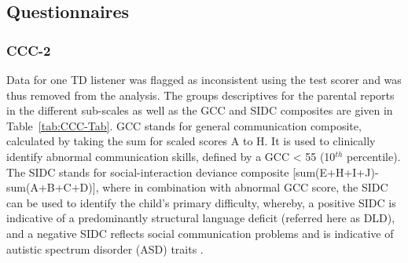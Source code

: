 \documentclass[a4paper, twoside]{templates/ociamthesis}
\begin{document}
\hypertarget{questionnaires-1}{%
\subsection{Questionnaires}\label{questionnaires-1}}

\hypertarget{ccc-2}{%
\subsubsection{CCC-2}\label{ccc-2}}

Data for one TD listener was flagged as inconsistent using the test scorer and was thus removed from the analysis. The groups descriptives for the parental reports in the different sub-scales as well as the GCC and SIDC composites are given in Table~\ref{tab:CCC-Tab}. GCC stands for general communication composite, calculated by taking the sum for scaled scores A to H. It is used to clinically identify abnormal communication skills, defined by a GCC \textless{} 55 (10\(^{th}\) percentile). The SIDC stands for social-interaction deviance composite {[}sum(E+H+I+J)-sum(A+B+C+D){]}, where in combination with abnormal GCC score, the SIDC can be used to identify the child's primary difficulty, whereby, a positive SIDC is indicative of a predominantly structural language deficit (referred here as DLD), and a negative SIDC reflects social communication problems and is indicative of autistic spectrum disorder (ASD) traits \autocite{Norbury2014,Bishop2003}.\\
\end{document}
